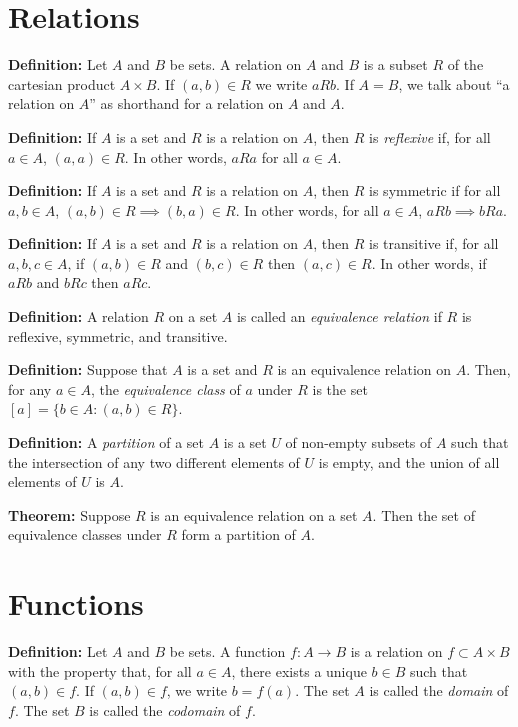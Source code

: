 \documentclass[
]{article}
\author{}
\date{}
\begin{document}
\hypertarget{relations}{%
\section{Relations}\label{relations}}

\textbf{Definition:} Let \(A\) and \(B\) be sets. A relation on \(A\)
and \(B\) is a subset \(R\) of the cartesian product \(A\times B\). If
\((a,b)\in R\) we write \(aRb\). If \(A=B\), we talk about ``a relation
on \(A\)'' as shorthand for a relation on \(A\) and \(A\).

\textbf{Definition:} If \(A\) is a set and \(R\) is a relation on \(A\),
then \(R\) is \emph{reflexive} if, for all \(a\in A\), \((a,a)\in R\).
In other words, \(aRa\) for all \(a\in A\).

\textbf{Definition:} If \(A\) is a set and \(R\) is a relation on \(A\),
then \(R\) is symmetric if for all \(a,b\in A\),
\((a,b)\in R\implies (b,a)\in R\). In other words, for all \(a\in A\),
\(aRb\implies bRa\).

\textbf{Definition:} If \(A\) is a set and \(R\) is a relation on \(A\),
then \(R\) is transitive if, for all \(a,b,c\in A\), if \((a,b)\in R\)
and \((b,c)\in R\) then \((a,c)\in R\). In other words, if \(aRb\) and
\(bRc\) then \(aRc\).

\textbf{Definition:} A relation \(R\) on a set \(A\) is called an
\emph{equivalence relation} if \(R\) is reflexive, symmetric, and
transitive.

\textbf{Definition:} Suppose that \(A\) is a set and \(R\) is an
equivalence relation on \(A\). Then, for any \(a\in A\), the
\emph{equivalence class} of \(a\) under \(R\) is the set
\([a] = \{b\in A: (a,b)\in R\}\).

\textbf{Definition:} A \emph{partition} of a set \(A\) is a set \(U\) of
non-empty subsets of \(A\) such that the intersection of any two
different elements of \(U\) is empty, and the union of all elements of
\(U\) is \(A\).

\textbf{Theorem:} Suppose \(R\) is an equivalence relation on a set
\(A\). Then the set of equivalence classes under \(R\) form a partition
of \(A\).

\vfill\eject

\hypertarget{functions}{%
\section{Functions}\label{functions}}

\textbf{Definition:} Let \(A\) and \(B\) be sets. A function
\(f:A\to B\) is a relation on \(f\subset A\times B\) with the property
that, for all \(a\in A\), there exists a unique \(b\in B\) such that
\((a,b)\in f\). If \((a,b)\in f\), we write \(b=f(a)\). The set \(A\) is
called the \emph{domain} of \(f\). The set \(B\) is called the
\emph{codomain} of \(f\).
\end{document}
